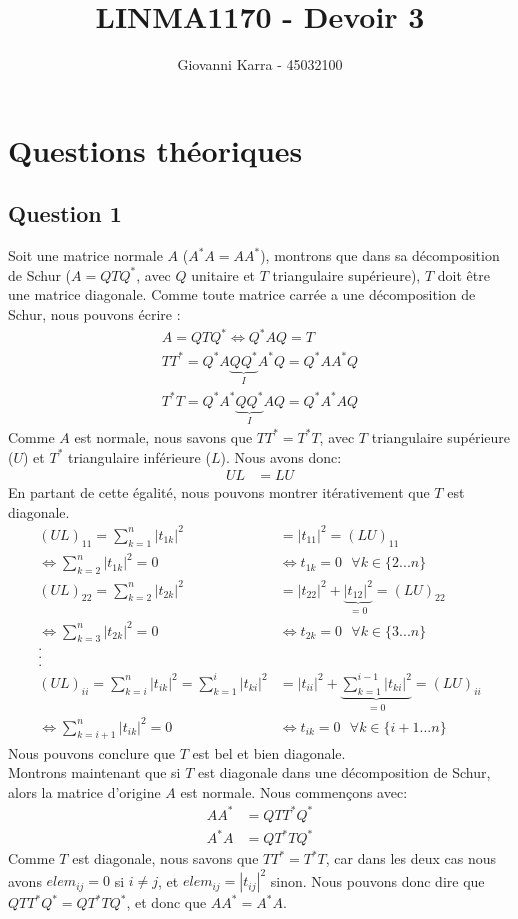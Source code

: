 \documentclass[11pt]{article}
\title{LINMA1170 - Devoir 3}
\author{Giovanni Karra - 45032100}
\begin{document}
\maketitle

\section*{Questions théoriques}

\subsection*{Question 1}

Soit une matrice normale $A$ ($A^*A = AA^*$), montrons que dans sa décomposition de Schur ($A = QTQ^*$, avec $Q$ unitaire et $T$ triangulaire supérieure), $T$ doit être une matrice diagonale. Comme toute matrice carrée a une décomposition de Schur, nous pouvons écrire :
\begin{align}
	A = QTQ^* \Leftrightarrow Q^*AQ = T\\
	TT^* = Q^*A\underbrace{QQ^*}_IA^*Q = Q^*AA^*Q\\
	T^*T = Q^*A^*\underbrace{QQ^*}_IAQ = Q^*A^*AQ
\end{align}
Comme $A$ est normale, nous savons que $TT^* = T^*T$, avec $T$ triangulaire supérieure ($U$) et $T^*$ triangulaire inférieure ($L$). Nous avons donc:
\begin{align*}
	UL &= LU
\end{align*}
En partant de cette égalité, nous pouvons montrer itérativement que $T$ est diagonale.
\begin{align*}
	(UL)_{11} = \sum_{k=1}^{n}|t_{1k}|^2 &= |t_{11}|^2 = (LU)_{11}\\
	\Leftrightarrow \sum_{k=2}^{n}|t_{1k}|^2 = 0 &\Leftrightarrow t_{1k} = 0 ~~~ \forall k \in \{2...n\}\\
	(UL)_{22} = \sum_{k=2}^{n}|t_{2k}|^2 &= |t_{22}|^2 + \underbrace{|t_{12}|^2}_{=0} = (LU)_{22}\\
	\Leftrightarrow \sum_{k=3}^{n}|t_{2k}|^2 = 0 &\Leftrightarrow t_{2k} = 0 ~~~ \forall k \in \{3...n\}\\ . \\ . \\ . \\
	(UL)_{ii} = \sum_{k=i}^{n}|t_{ik}|^2 = \sum_{k=1}^{i}|t_{ki}|^2 &= |t_{ii}|^2 + \underbrace{\sum_{k=1}^{i-1}|t_{ki}|^2}_{= 0} = (LU)_{ii}\\
	\Leftrightarrow \sum_{k=i+1}^{n}|t_{ik}|^2 = 0 &\Leftrightarrow t_{ik} = 0 ~~~ \forall k \in \{i+1...n\}
\end{align*}
Nous pouvons conclure que $T$ est bel et bien diagonale.\\
Montrons maintenant que si $T$ est diagonale dans une décomposition de Schur, alors la matrice d'origine $A$ est normale. Nous commençons avec:
\begin{align}
	AA^* &= QTT^*Q^*\\
	A^*A &= QT^*TQ^*
\end{align}
Comme $T$ est diagonale, nous savons que $TT^* = T^*T$, car dans les deux cas nous avons $elem_{ij} = 0$ si $i \neq j$, et $elem_{ij} = |t_{ij}|^2$ sinon. Nous pouvons donc dire que $QTT^*Q^* = QT^*TQ^*$, et donc que $AA^* = A^*A$.
\end{document}
